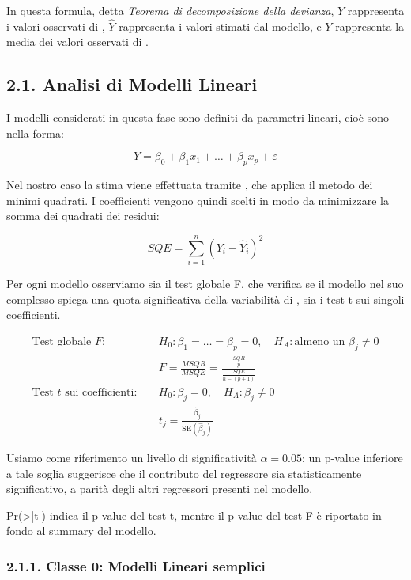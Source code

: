 In questa formula, detta \emph{Teorema di decomposizione della devianza}, $Y$ rappresenta i valori osservati di \texttt{}, $\hat{Y}$ rappresenta i valori stimati dal modello, e $\bar{Y}$ rappresenta la media dei valori osservati di \texttt{}.

\subsection{2.1. Analisi di Modelli Lineari}
\label{sec:21-analisi-di-modelli-lineari}

I modelli considerati in questa fase sono definiti da parametri lineari, cioè sono nella forma:

\[
Y = \beta_0 + \beta_1 x_1 + \dots + \beta_p x_p + \varepsilon
\]

Nel nostro caso la stima viene effettuata tramite \texttt{}, che applica il metodo dei minimi quadrati. I coefficienti vengono quindi scelti in modo da minimizzare la somma dei quadrati dei residui:

\[
SQE = \sum_{i=1}^{n}(Y_i - \hat{Y}_i)^2
\]

Per ogni modello osserviamo sia il test globale F, che verifica se il modello nel suo complesso spiega una quota significativa della variabilità di \texttt{}, sia i test t sui singoli coefficienti.

\[
\begin{aligned}
\text{Test globale } F:\quad
& H_0: \beta_1 = \dots = \beta_p = 0,\quad
  H_A: \text{almeno un } \beta_j \neq 0\\
& F = \frac{MSQR}{MSQE}
    = \displaystyle{\frac{\frac{SQR}{p}}{\frac{SQE}{n-(p+1)}}}\\[0.6em]
\text{Test } t \text{ sui coefficienti}:\quad
& H_0: \beta_j = 0,\quad H_A: \beta_j \neq 0\\
& t_j = \displaystyle{\frac{\hat{\beta}_j}{\text{SE}(\hat{\beta}_j)}}
\end{aligned}
\]

Usiamo come riferimento un livello di significatività $\alpha = 0.05$: un p-value inferiore a tale soglia suggerisce che il contributo del regressore sia statisticamente significativo, a parità degli altri regressori presenti nel modello.

Pr(\textgreater{}|t|) indica il p-value del test t, mentre il p-value del test F è riportato in fondo al summary del modello.

\subsubsection{2.1.1. Classe 0: Modelli Lineari semplici}
\label{sec:211-classe-0-modelli-lineari-semplici}

